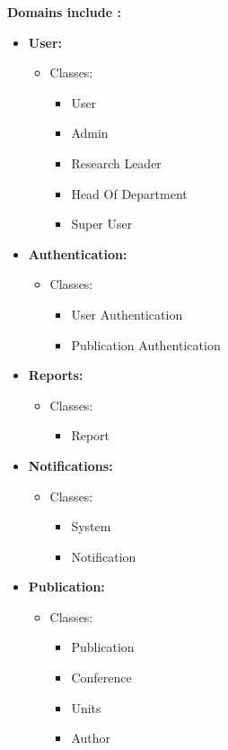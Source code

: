 \documentclass{article}
\begin{document}
			\clearpage
		\textbf{Domains include :}
			\begin{itemize} 
				\item \textbf{User:}
					\begin{itemize}
					\item Classes:
						\begin{itemize}
						\item User
						\item Admin
						\item Research Leader
						\item Head Of Department
						\item Super User
						\end{itemize}
					\end{itemize}
					
				\item \textbf{Authentication:}
					\begin{itemize}
					\item Classes:
						\begin{itemize}
						\item User Authentication
						\item Publication Authentication
						\end{itemize}
					\end{itemize}
					
				\item \textbf{Reports:}
					\begin{itemize}
					\item { Classes:}
						\begin{itemize}
						\item Report
						\end{itemize}
					\end{itemize}
					
				\item \textbf{Notifications:}
					\begin{itemize}
					\item { Classes:}
						\begin{itemize}
						\item System
						\item Notification
						\end{itemize}
					\end{itemize}
					
				\item \textbf{Publication:}
					\begin{itemize}
					\item { Classes:}
						\begin{itemize}
						\item Publication
						\item Conference
						\item Units
						\item Author
						\end{itemize}
					\end{itemize}				
				
			\end{itemize}
		
\end{document}
